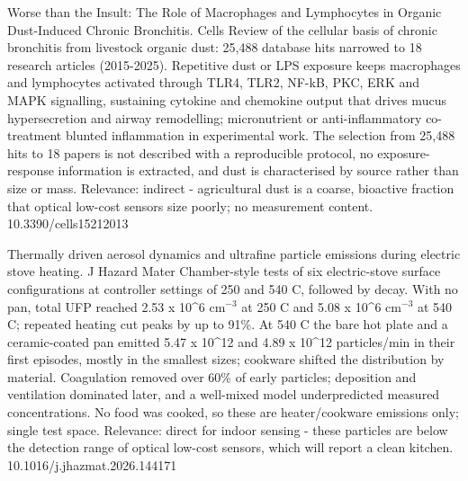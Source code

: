 \documentclass[10pt]{article}
\begin{document}
{Worse than the Insult: The Role of Macrophages and Lymphocytes in Organic Dust-Induced Chronic Bronchitis.}
{Cells}
{Review of the cellular basis of chronic bronchitis from livestock organic dust: 25,488 database hits narrowed to 18 research articles (2015-2025). Repetitive dust or LPS exposure keeps macrophages and lymphocytes activated through TLR4, TLR2, NF-kB, PKC, ERK and MAPK signalling, sustaining cytokine and chemokine output that drives mucus hypersecretion and airway remodelling; micronutrient or anti-inflammatory co-treatment blunted inflammation in experimental work. The selection from 25,488 hits to 18 papers is not described with a reproducible protocol, no exposure-response information is extracted, and dust is characterised by source rather than size or mass. Relevance: indirect - agricultural dust is a coarse, bioactive fraction that optical low-cost sensors size poorly; no measurement content.}
{10.3390/cells15212013}

{Thermally driven aerosol dynamics and ultrafine particle emissions during electric stove heating.}
{J Hazard Mater}
{Chamber-style tests of six electric-stove surface configurations at controller settings of 250 and 540 C, followed by decay. With no pan, total UFP reached 2.53 x 10\textasciicircum{}6 cm$^{-3}$ at 250 C and 5.08 x 10\textasciicircum{}6 cm$^{-3}$ at 540 C; repeated heating cut peaks by up to 91\%. At 540 C the bare hot plate and a ceramic-coated pan emitted 5.47 x 10\textasciicircum{}12 and 4.89 x 10\textasciicircum{}12 particles/min in their first episodes, mostly in the smallest sizes; cookware shifted the distribution by material. Coagulation removed over 60\% of early particles; deposition and ventilation dominated later, and a well-mixed model underpredicted measured concentrations. No food was cooked, so these are heater/cookware emissions only; single test space. Relevance: direct for indoor sensing - these particles are below the detection range of optical low-cost sensors, which will report a clean kitchen.}
{10.1016/j.jhazmat.2026.144171}
\end{document}
